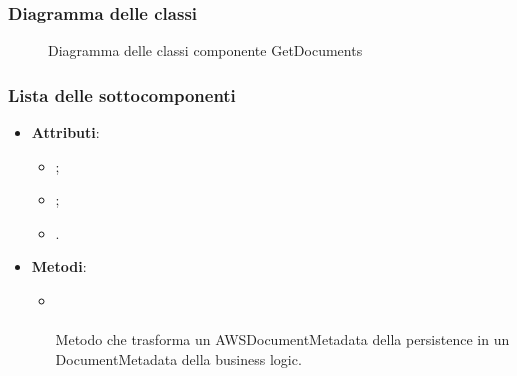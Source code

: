 \documentclass[10pt, a4paper]{article}
\begin{document}
\subsubsection{Diagramma delle classi}
\begin{figure}[H]
    \centering        
    \caption{Diagramma delle classi componente GetDocuments}
\end{figure}


\subsubsection{Lista delle sottocomponenti}


\label{AWSDocumentMetadataDettaglio}
\begin{itemize}
    \item \textbf{Attributi}:
    \begin{itemize}
        \item {};
        \item {};
        \item {}.
    \end{itemize}
    \item \textbf{Metodi}:
    \begin{itemize}
        \item {}\\ \\
        Metodo che trasforma un AWSDocumentMetadata della persistence in un DocumentMetadata della business logic.
    \end{itemize}
\end{itemize}
\end{document}
